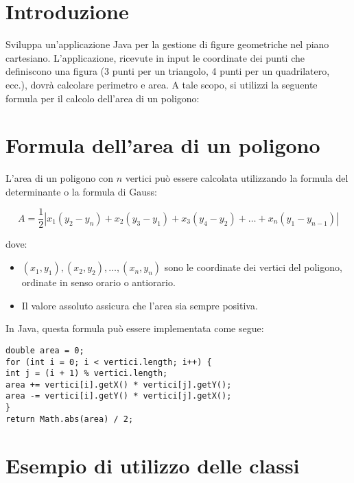 \documentclass{article}
\title{}
\author{}
\date{}
\begin{document}
\maketitle
\vspace{-2.5cm} %
\section*{Introduzione}
Sviluppa un'applicazione Java per la gestione di figure geometriche nel piano cartesiano. L'applicazione, ricevute in input le coordinate dei punti che definiscono una figura (3 punti per un triangolo, 4 punti per un quadrilatero, ecc.), dovrà calcolare perimetro e area.  A tale scopo, si utilizzi la seguente formula per il calcolo dell'area di un poligono:

\section*{Formula dell'area di un poligono}
L'area di un poligono con $n$ vertici può essere calcolata utilizzando la formula del determinante o la formula di Gauss:

\begin{equation}
A = \frac{1}{2} \left| x_1(y_2 - y_n) + x_2(y_3 - y_1) + x_3(y_4 - y_2) + \dots + x_n(y_1 - y_{n-1}) \right|
\end{equation}

dove:
\begin{itemize}
\item $(x_1, y_1), (x_2, y_2), \dots, (x_n, y_n)$ sono le coordinate dei vertici del poligono, ordinate in senso orario o antiorario.
\item Il valore assoluto assicura che l'area sia sempre positiva.
\end{itemize}

\noindent In Java, questa formula può essere implementata come segue:

\begin{verbatim}
double area = 0;
for (int i = 0; i < vertici.length; i++) {
int j = (i + 1) % vertici.length;
area += vertici[i].getX() * vertici[j].getY();
area -= vertici[i].getY() * vertici[j].getX();
}
return Math.abs(area) / 2;
\end{verbatim}

\section*{Esempio di utilizzo delle classi}
\end{document}
